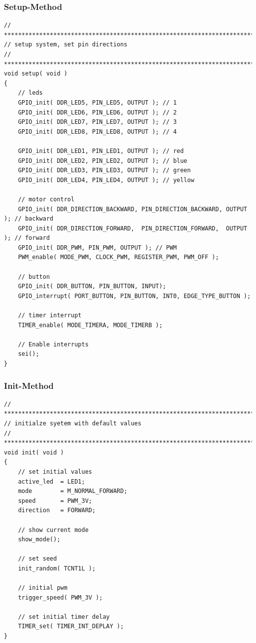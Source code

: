 \subsubsection{Setup-Method}
\begin{lstlisting}[caption={Setup-Method},label=lst:setup]
// ****************************************************************************
// setup system, set pin directions
// ***************************************************************************/
void setup( void )
{
	// leds
	GPIO_init( DDR_LED5, PIN_LED5, OUTPUT ); // 1
	GPIO_init( DDR_LED6, PIN_LED6, OUTPUT ); // 2
	GPIO_init( DDR_LED7, PIN_LED7, OUTPUT ); // 3
	GPIO_init( DDR_LED8, PIN_LED8, OUTPUT ); // 4

	GPIO_init( DDR_LED1, PIN_LED1, OUTPUT ); // red
	GPIO_init( DDR_LED2, PIN_LED2, OUTPUT ); // blue
	GPIO_init( DDR_LED3, PIN_LED3, OUTPUT ); // green
	GPIO_init( DDR_LED4, PIN_LED4, OUTPUT ); // yellow

	// motor control
	GPIO_init( DDR_DIRECTION_BACKWARD, PIN_DIRECTION_BACKWARD, OUTPUT ); // backward
	GPIO_init( DDR_DIRECTION_FORWARD,  PIN_DIRECTION_FORWARD,  OUTPUT ); // forward
	GPIO_init( DDR_PWM, PIN_PWM, OUTPUT ); // PWM
	PWM_enable( MODE_PWM, CLOCK_PWM, REGISTER_PWM, PWM_OFF );

	// button
	GPIO_init( DDR_BUTTON, PIN_BUTTON, INPUT);
	GPIO_interrupt( PORT_BUTTON, PIN_BUTTON, INT0, EDGE_TYPE_BUTTON );

	// timer interrupt
	TIMER_enable( MODE_TIMERA, MODE_TIMERB );

	// Enable interrupts
	sei();
}
\end{lstlisting}
\vspace{0.5cm}

\subsubsection{Init-Method}
\begin{lstlisting}[caption={Init-Method},label=lst:init]
// ****************************************************************************
// initialze syetem with default values
// ***************************************************************************/
void init( void )
{
	// set initial values
	active_led  = LED1;
	mode        = M_NORMAL_FORWARD;
	speed       = PWM_3V;
	direction   = FORWARD;

	// show current mode
	show_mode();

	// set seed
	init_random( TCNT1L );

	// initial pwm
	trigger_speed( PWM_3V );

	// set initial timer delay
	TIMER_set( TIMER_INT_DEPLAY );
}
\end{lstlisting}
\vspace{0.5cm}

